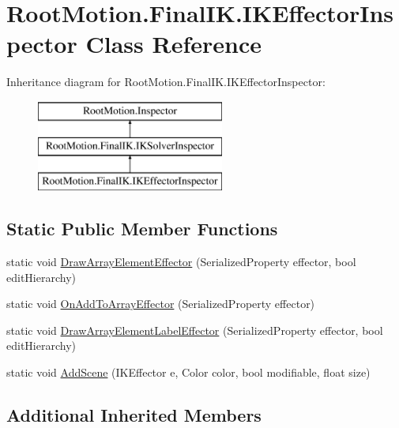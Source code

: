 \hypertarget{class_root_motion_1_1_final_i_k_1_1_i_k_effector_inspector}{}\section{Root\+Motion.\+Final\+I\+K.\+I\+K\+Effector\+Inspector Class Reference}
\label{class_root_motion_1_1_final_i_k_1_1_i_k_effector_inspector}
Inheritance diagram for Root\+Motion.\+Final\+I\+K.\+I\+K\+Effector\+Inspector\+:\begin{figure}[H]
\begin{center}
\leavevmode
\includegraphics[height=3.000000cm]{class_root_motion_1_1_final_i_k_1_1_i_k_effector_inspector}
\end{center}
\end{figure}
\subsection*{Static Public Member Functions}
\begin{DoxyCompactItemize}
\item 
static void \mbox{\hyperlink{class_root_motion_1_1_final_i_k_1_1_i_k_effector_inspector_ac73331b2942aefecae6c8e3316d67875}{Draw\+Array\+Element\+Effector}} (Serialized\+Property effector, bool edit\+Hierarchy)
\item 
static void \mbox{\hyperlink{class_root_motion_1_1_final_i_k_1_1_i_k_effector_inspector_aa8c720e0f5319c4e69abd3e71464df5e}{On\+Add\+To\+Array\+Effector}} (Serialized\+Property effector)
\item 
static void \mbox{\hyperlink{class_root_motion_1_1_final_i_k_1_1_i_k_effector_inspector_a48eaeb2c5cbd550a36ff9569272cc226}{Draw\+Array\+Element\+Label\+Effector}} (Serialized\+Property effector, bool edit\+Hierarchy)
\item 
static void \mbox{\hyperlink{class_root_motion_1_1_final_i_k_1_1_i_k_effector_inspector_aad1b9e270a2e46023b2607f906da9df8}{Add\+Scene}} (I\+K\+Effector e, Color color, bool modifiable, float size)
\end{DoxyCompactItemize}
\subsection*{Additional Inherited Members}


